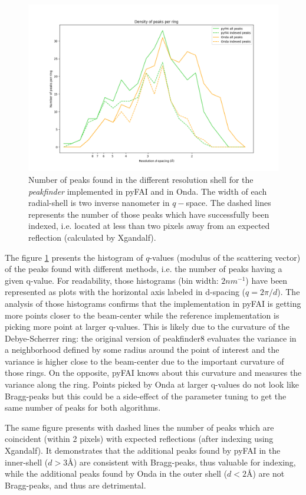 \documentclass[preprint]{iucr}              %
\begin{document}
\begin{figure}
\label{peak_per_ring}
\includegraphics[width=12cm]{peak_per_ring}
\caption{Number of peaks found in the different resolution shell for the \textit{peakfinder} implemented in pyFAI and in Onda. 
The width of each radial-shell is two inverse nanometer in $q-$space. 
The dashed lines represents the number of those peaks which have successfully been indexed, i.e. located at less than two pixels away from an expected reflection (calculated by Xgandalf). }
\end{figure}

The figure \ref{peak_per_ring} presents the histogram of $q$-values (modulus of the scattering vector) of the peaks found with different methods, i.e. the number of peaks having a given q-value.
For readability, those histograms (bin width: $2 nm^{-1}$) have been represented as plots with the horizontal axis labeled in d-spacing ($q=2\pi/d$).  
The analysis of those histograms confirms that the implementation in pyFAI is getting more points closer to the beam-center while the reference implementation is picking more point at larger q-values.
This is likely due to the curvature of the Debye-Scherrer ring: the original version of peakfinder8 evaluates the variance in a neighborhood defined by some radius around the point of interest and the variance is higher close to the beam-center due to the important curvature of those rings.
On the opposite, pyFAI knows about this curvature and measures the variance along the ring.
Points picked by Onda at larger q-values do not look like Bragg-peaks but this could be a side-effect of the parameter tuning to get the same number of peaks for both algorithms.

The same figure presents with dashed lines the number of peaks which are coincident (within 2 pixels) with expected reflections (after indexing using Xgandalf).
It demonstrates that the additional peaks found by pyFAI in the inner-shell ($d>3$\AA{}) are consistent with Bragg-peaks, thus valuable for indexing, while the additional peaks found by Onda in the outer shell ($d<2$\AA) are not Bragg-peaks, and thus are detrimental.
\end{document}
